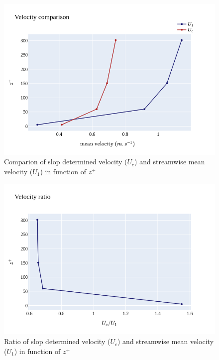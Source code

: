 \documentclass[]{article}
\theoremstyle{plain}
\theoremstyle{remark}
\begin{document}
\begin{figure}[h!]
	\begin{center}
		\includegraphics[width=\textwidth]{../output/split_time/frozen_turbulence/correlation2D/u_1c.png}
		\caption{Comparion of slop determined velocity ($U_c$) and streamwise mean velocity ($U_1$) in function of $z^+$}
	\end{center}
\end{figure}

\begin{figure}[h!]
	\begin{center}
		\includegraphics[width=\textwidth]{../output/split_time/frozen_turbulence/correlation2D/u_ratio.png}
		\caption{Ratio of slop determined velocity ($U_c$) and streamwise mean velocity ($U_1$) in function of $z^+$}
	\end{center}
\end{figure}
\end{document}
